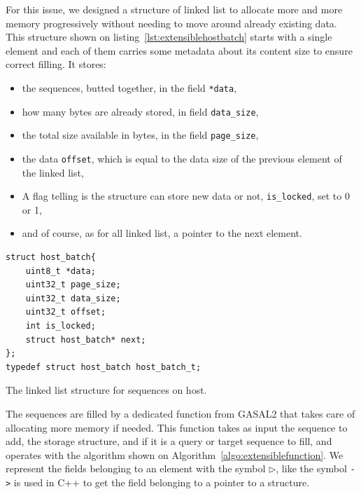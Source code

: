 For this issue, we designed a structure of linked list to allocate more and more memory progressively without needing to move around already existing data. This structure shown on listing~\ref{lst:extensiblehostbatch} starts with a single element and each of them carries some metadata about its content size to ensure correct filling. It stores:

\begin{itemize}
	\item the sequences, butted together, in the field \verb|*data|,
	\item how many bytes are already stored, in field \verb|data_size|,
	\item the total size available in bytes, in the field \verb|page_size|,
	\item the data \verb|offset|, which is equal to the data size of the previous element of the linked list,
	\item A flag telling is the structure can store new data or not, \verb|is_locked|, set to 0 or 1,
	\item and of course, as for all linked list, a pointer to the next element.
\end{itemize}

\begin{listing}[h!]
	\begin{verbatim}
struct host_batch{
	uint8_t *data;
	uint32_t page_size;
	uint32_t data_size;
	uint32_t offset;
	int is_locked;
	struct host_batch* next;
};
typedef struct host_batch host_batch_t;
	\end{verbatim}
\caption{The linked list structure for sequences on host.}
\label{lst:extensiblehostbatch}
\end{listing}

The sequences are filled by a dedicated function from GASAL2 that takes care of allocating more memory if needed. This function takes as input the sequence to add, the storage structure, and if it is a query or target sequence to fill, and operates with the algorithm shown on Algorithm~\ref{algo:extensiblefunction}. We represent the fields belonging to an element with the symbol $\rhd$, like the symbol \verb|->| is used in C++ to get the field belonging to a pointer to a structure.


